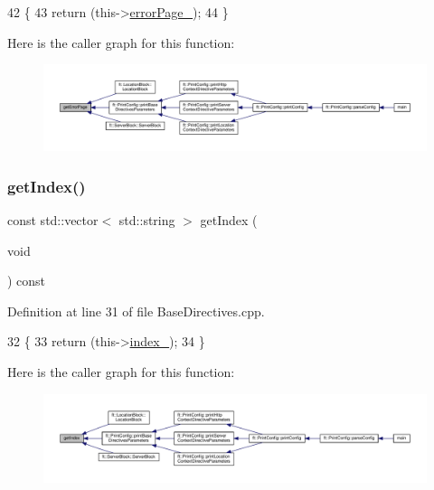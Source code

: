 \begin{DoxyCode}
42     \{
43         \textcolor{keywordflow}{return} (this->\hyperlink{classft_1_1_base_directives_a5c0d388109f086503961de84fe3fce90}{errorPage\_});
44     \}
\end{DoxyCode}
Here is the caller graph for this function\+:
\nopagebreak
\begin{figure}[H]
\begin{center}
\leavevmode
\includegraphics[width=350pt]{classft_1_1_base_directives_a3cb0c21f17781de392d5ee09d7190caf_icgraph}
\end{center}
\end{figure}
\mbox{\label{classft_1_1_base_directives_a018f34a5ffd66e891494b5c0ee69177b}} 
\subsubsection{\texorpdfstring{get\+Index()}{getIndex()}}
{\footnotesize\ttfamily const std\+::vector$<$ std\+::string $>$ get\+Index (\begin{DoxyParamCaption}\item[{void}]{ }\end{DoxyParamCaption}) const\hspace{0.3cm}{\ttfamily [inherited]}}



Definition at line 31 of file Base\+Directives.\+cpp.


\begin{DoxyCode}
32     \{
33         \textcolor{keywordflow}{return} (this->\hyperlink{classft_1_1_base_directives_a6ba30626837f300201cd32c35d50aa49}{index\_});
34     \}
\end{DoxyCode}
Here is the caller graph for this function\+:
\nopagebreak
\begin{figure}[H]
\begin{center}
\leavevmode
\includegraphics[width=350pt]{classft_1_1_base_directives_a018f34a5ffd66e891494b5c0ee69177b_icgraph}
\end{center}
\end{figure}
\mbox{\label{classft_1_1_base_directives_ab8574338758f65325cab5d1c394826c8}} 
